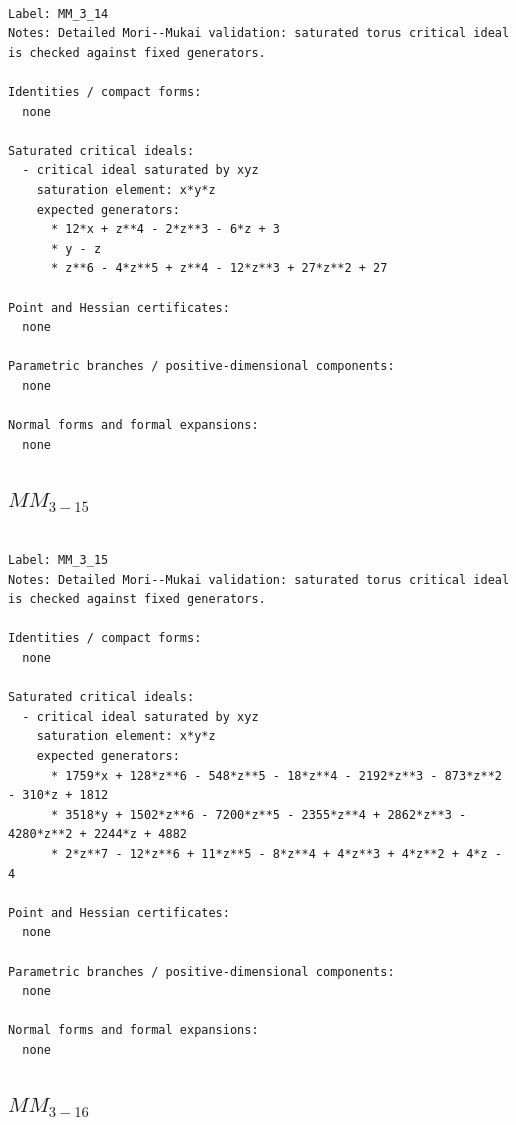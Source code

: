 \documentclass[10pt,a4paper]{article}
\begin{document}
\begin{lstlisting}

Label: MM_3_14
Notes: Detailed Mori--Mukai validation: saturated torus critical ideal is checked against fixed generators.

Identities / compact forms:
  none

Saturated critical ideals:
  - critical ideal saturated by xyz
    saturation element: x*y*z
    expected generators:
      * 12*x + z**4 - 2*z**3 - 6*z + 3
      * y - z
      * z**6 - 4*z**5 + z**4 - 12*z**3 + 27*z**2 + 27

Point and Hessian certificates:
  none

Parametric branches / positive-dimensional components:
  none

Normal forms and formal expansions:
  none

\end{lstlisting}

\subsection*{$ MM_{3-15} $}

\begin{lstlisting}

Label: MM_3_15
Notes: Detailed Mori--Mukai validation: saturated torus critical ideal is checked against fixed generators.

Identities / compact forms:
  none

Saturated critical ideals:
  - critical ideal saturated by xyz
    saturation element: x*y*z
    expected generators:
      * 1759*x + 128*z**6 - 548*z**5 - 18*z**4 - 2192*z**3 - 873*z**2 - 310*z + 1812
      * 3518*y + 1502*z**6 - 7200*z**5 - 2355*z**4 + 2862*z**3 - 4280*z**2 + 2244*z + 4882
      * 2*z**7 - 12*z**6 + 11*z**5 - 8*z**4 + 4*z**3 + 4*z**2 + 4*z - 4

Point and Hessian certificates:
  none

Parametric branches / positive-dimensional components:
  none

Normal forms and formal expansions:
  none

\end{lstlisting}

\subsection*{$ MM_{3-16} $}
\end{document}
